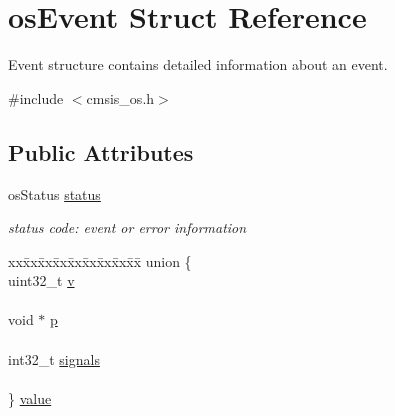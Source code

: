 \hypertarget{structos_event}{}\section{os\+Event Struct Reference}
\label{structos_event}


Event structure contains detailed information about an event.  




{\ttfamily \#include $<$cmsis\+\_\+os.\+h$>$}

\subsection*{Public Attributes}
\begin{DoxyCompactItemize}
\item 
\mbox{\label{structos_event_aafcd2cedd08e033f9df25fd9875caaf2}} 
os\+Status \mbox{\hyperlink{structos_event_aafcd2cedd08e033f9df25fd9875caaf2}{status}}
\begin{DoxyCompactList}\small\item\em status code\+: event or error information \end{DoxyCompactList}\item 
\mbox{\label{structos_event_a6ab3a136fcbc038e555992db3d3e95ba}} 
\begin{tabbing}
xx\=xx\=xx\=xx\=xx\=xx\=xx\=xx\=xx\=\kill
union \{\\
\>uint32\_t \mbox{\hyperlink{structos_event_a5d2bb38f7be9c75f508646c24d2de4b1}{v}}\\
\>\\
\>void $\ast$ \mbox{\hyperlink{structos_event_a70b8f3f364cf158c9e538c5f590d1393}{p}}\\
\>\\
\>int32\_t \mbox{\hyperlink{structos_event_ad63c33b8b5d3bb37b45433d7c67d1e09}{signals}}\\
\>\\
\} \mbox{\hyperlink{structos_event_a6ab3a136fcbc038e555992db3d3e95ba}{value}}\\


\end{tabbing}
\end{DoxyCompactItemize}
